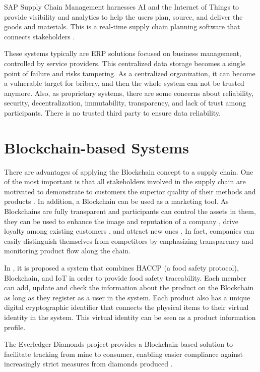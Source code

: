 SAP Supply Chain Management harnesses AI and the Internet of Things to provide visibility and analytics to help the users plan, source, and deliver the goods and materials.  This is a real-time supply chain planning software that connects stakeholders \cite{snapp2010discover}.

These systems typically are ERP solutions focused on business management, controlled by service providers.  This centralized data  storage becomes a single point of failure and risks tampering. As a centralized organization, it can become a vulnerable target for  bribery, and then the whole system can not be trusted anymore. Also, as proprietary systems, there are some concerns about reliability, security, decentralization, immutability, transparency, and lack of trust among participants. There is no trusted third party to ensure data reliability. 

\section{Blockchain-based Systems} \label{sec:BlockchainBasedSystems}

There are advantages of applying the Blockchain concept to a supply chain. One of the most important is that all stakeholders involved in the supply chain are motivated to demonstrate to customers the superior quality of their methods and products \cite{lu2017adaptable}. In addition, a Blockchain can be used as a marketing tool. As Blockchains are fully transparent and participants can control the assets in them, they can be used to enhance the image and reputation of a company \cite{van2007essentials}, drive loyalty among existing customers \cite{pizzuti2015global}, and attract new ones \cite{svensson2009transparency}. In fact, companies can easily distinguish themselves from competitors by emphasizing transparency and monitoring product flow along the chain. 

In \cite{tian2017supply}, it is proposed a system that combines HACCP (a food safety protocol), Blockchain, and IoT in order to provide food safety traceability. Each member can add, update and check the information about the product on the Blockchain as long as they register as a user in the system. Each product also has a unique digital cryptographic identifier that connects the physical items to their virtual identity in the system. This virtual identity can be seen as a product information profile.

The Everledger Diamonds project provides a Blockchain-based solution to facilitate tracking from mine to consumer, enabling easier compliance against increasingly strict measures from diamonds produced \cite{crosby2016blockchain}.

